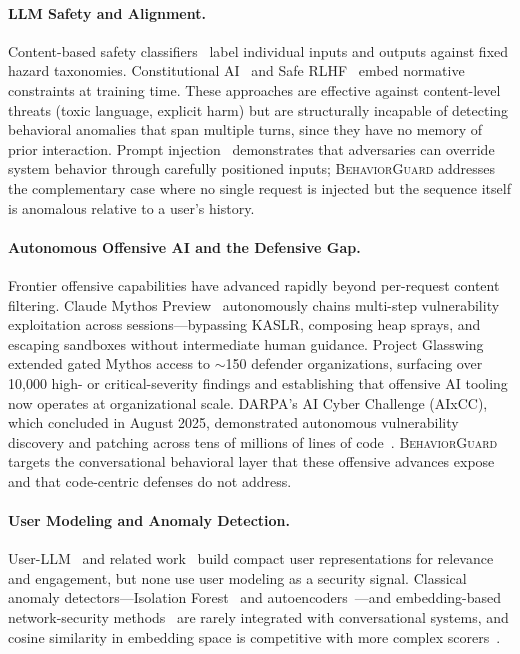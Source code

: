 \documentclass[conference]{IEEEtran}
\newcommand{\BG}{\textsc{BehaviorGuard}}
\begin{document}
\paragraph{LLM Safety and Alignment.}
Content-based safety classifiers~\cite{inan2023llamaguard,meta2024llamaguard3} label
individual inputs and outputs against fixed hazard taxonomies.
Constitutional AI~\cite{bai2022constitutional} and Safe RLHF~\cite{dai2023saferlhf,
pku2025saferlhf} embed normative constraints at training time.
These approaches are effective against content-level threats (toxic language, explicit
harm) but are structurally incapable of detecting behavioral anomalies that span multiple
turns, since they have no memory of prior interaction.
Prompt injection~\cite{owasp2025llm01,lakera2025chatbot,zhang2025systematic}
demonstrates that adversaries can override system behavior through carefully positioned
inputs; \BG{} addresses the complementary case where no single request is injected but
the sequence itself is anomalous relative to a user's history.

\paragraph{Autonomous Offensive AI and the Defensive Gap.}
Frontier offensive capabilities have advanced rapidly beyond per-request content
filtering.
Claude Mythos Preview~\cite{anthropic2026mythos} autonomously chains multi-step
vulnerability exploitation across sessions---bypassing KASLR, composing heap sprays,
and escaping sandboxes without intermediate human guidance.
Project Glasswing~\cite{anthropic2026glasswing} extended gated Mythos access to
$\sim$150 defender organizations, surfacing over 10{,}000 high- or critical-severity
findings and establishing that offensive AI tooling now operates at organizational
scale.
DARPA's AI Cyber Challenge (AIxCC), which concluded in August 2025, demonstrated
autonomous vulnerability discovery and patching across tens of millions of lines of
code~\cite{darpa2025aixcc}.
\BG{} targets the conversational behavioral layer that these offensive advances expose
and that code-centric defenses do not address.

\paragraph{User Modeling and Anomaly Detection.}
User-LLM~\cite{google2025userllm} and related work~\cite{li2025difference,chen2025latent,
salemi2025personalllm,apple2024personalization} build compact user representations for
relevance and engagement, but none use user modeling as a security signal.
Classical anomaly detectors---Isolation Forest~\cite{liu2008isolation,matlab2024isolation}
and autoencoders~\cite{fernandez2024autoencoders,alqahtani2022deep}---and embedding-based
network-security methods~\cite{li2025aptllm} are rarely integrated with conversational
systems, and cosine similarity in embedding space is competitive with more complex
scorers~\cite{zhao2024cosine}.
\end{document}
